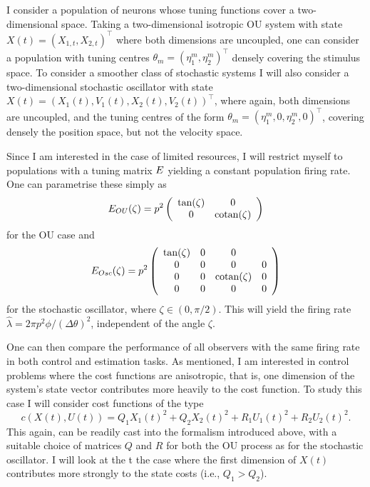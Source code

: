 I consider a
population of neurons whose tuning functions cover a two-dimensional space. Taking a two-dimensional isotropic OU system with state $X(t)=(X_{1,t},X_{2,t})^\top$ 
where both dimensions are uncoupled,
one can consider a population with tuning centres $\theta_m = (\eta^m_1,\eta^m_2)^\top$
densely covering the stimulus space. To consider a smoother class of stochastic systems I will also consider a two-dimensional stochastic oscillator with state
$X(t) = (X_1(t),V_1(t),X_2(t),V_2(t))^\top$, where again, both dimensions are uncoupled, and the tuning centres of the form 
$\theta_m = (\eta^m_1, 0, \eta^m_2,0)^\top$, covering densely the position space, but not the velocity space.\par
Since I am interested in the case of limited resources, I will restrict myself to populations with a tuning matrix $E$ yielding a constant population firing rate. One
can parametrise these simply as
\[
E_{OU}(\zeta) = p^2\left(\begin{array}{cc}\tan(\zeta)&0\\0&\operatorname{cotan}(\zeta)\end{array}\right)
\]
for the OU case and
\[
E_{Osc}(\zeta) = p^2\left(\begin{array}{cccc} \tan(\zeta) & 0 &  0\\ 0&0&0&0\\0&0& \operatorname{cotan}(\zeta)&0\\0&0&0&0\end{array}\right)
\]
for the stochastic oscillator, where $\zeta \in (0,\pi/2)$.
This will yield the firing rate $\hat{\lambda} = 2\pi p^2 \phi/(\Delta \theta)^2$, independent of the angle $\zeta$.\par

One can then compare the performance of all observers with the same firing rate in both control and estimation tasks.
As mentioned, I am interested in control problems where the cost functions are anisotropic, that is, one dimension of the system's state vector contributes more
heavily to the cost function. To study this case I will consider cost functions of the type
\[
c(X(t),U(t)) = Q_1 X_1(t)^2+ Q_2 X_2(t)^2 + R_1 U_1(t)^2 +R_2 U_2(t)^2.
\]
This again, can be readily cast into the formalism introduced above, with a suitable choice of matrices $Q$ and $R$ for both the OU process as for the stochastic
oscillator. I will look at the t the case where the first dimension of $X(t)$ contributes more strongly to the state costs (i.e., $Q_1 > Q_2$).

